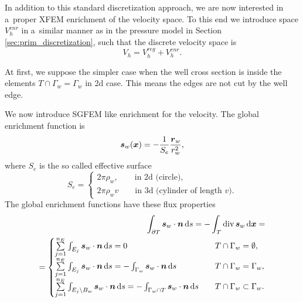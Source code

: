 

In addition to this standard discretization approach, we are now interested in a~proper XFEM enrichment of the velocity space.
To this end we introduce space $V_h^{enr}$ in a~similar manner as in the pressure model in Section \ref{sec:prim_discretization},
such that the discrete velocity space is
\begin{equation}
    V_h = V_h^{reg} + V_h^{enr}.
\end{equation}


At first, we suppose the simpler case when the well cross section is
inside the elements $T\cap\Gamma_w = \Gamma_w$ in 2d case.
This means the edges are not cut by the well edge.



We now introduce SGFEM like enrichment for the velocity.
The global enrichment function is
\begin{equation}
    \mathbf{\boldsymbol{s}}_w(\mathbf{\boldsymbol{x}}) = -\frac{1}{S_e} \frac{\mathbf{\boldsymbol{r}}_w}{r_w^2} \label{eqn:global_enr_vel},
\end{equation}
where $S_e$ is the so called effective surface
\[
S_e = \begin{cases}2\pi\rho_w, \qquad \textrm{in 2d (circle)}, \\ 2\pi\rho_w v \qquad \textrm{in 3d (cylinder of length }v).\end{cases}
\]
The global enrichment functions have these flux properties
\begin{align}
    \int_{\partial T} \mathbf{\boldsymbol{s}}_w\cdot\mathbf{\boldsymbol{n}} \,{\rm d} s = - \int_T {\rm div}\,\mathbf{\boldsymbol{s}}_w \,{\rm d}\mathbf{\boldsymbol{x}} = \nonumber\\
    = \begin{cases}
        \sum \limits_{j=1}^{n_E} \int_{E_j} \mathbf{\boldsymbol{s}}_w\cdot\mathbf{\boldsymbol{n}} \,{\rm d} s = 0
            & \quad T \cap \Gamma_w=\emptyset, \\
        \sum \limits_{j=1}^{n_E} \int_{E_j} \mathbf{\boldsymbol{s}}_w\cdot\mathbf{\boldsymbol{n}} \,{\rm d} s = 
            - \int_{\Gamma_w} \mathbf{\boldsymbol{s}}_w\cdot\mathbf{\boldsymbol{n}} \,{\rm d} s
            &\quad T \cap \Gamma_w=\Gamma_w, \\
        \sum \limits_{j=1}^{n_E} \int_{E_j\setminus B_w} \mathbf{\boldsymbol{s}}_w\cdot\mathbf{\boldsymbol{n}} \,{\rm d} s 
        = - \int_{\Gamma_w\cap T} \mathbf{\boldsymbol{s}}_w\cdot\mathbf{\boldsymbol{n}} \,{\rm d} s &\quad T \cap \Gamma_w\subset\Gamma_w. \\
    \end{cases}
\end{align}

